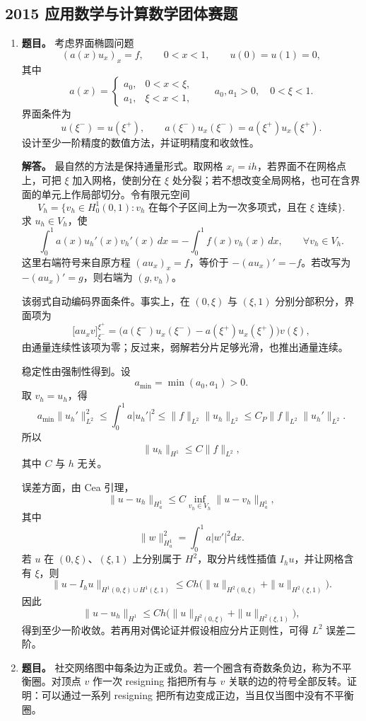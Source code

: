 ﻿\documentclass[UTF8,12pt]{ctexart}
\begin{document}
\subsection{2015 应用数学与计算数学团体赛题}
\begin{enumerate}[label=\textbf{\arabic*.},leftmargin=2.2em]
\item \textbf{题目。} 考虑界面椭圆问题
\[
(a(x)u_x)_x=f,\qquad 0<x<1,\qquad u(0)=u(1)=0,
\]
其中
\[
a(x)=
\begin{cases}
a_0,&0<x<\xi,\\
a_1,&\xi<x<1,
\end{cases}
\qquad a_0,a_1>0,\quad 0<\xi<1.
\]
界面条件为
\[
u(\xi^-)=u(\xi^+),\qquad
a(\xi^-)u_x(\xi^-)=a(\xi^+)u_x(\xi^+).
\]
设计至少一阶精度的数值方法，并证明精度和收敛性。

\textbf{解答。} 最自然的方法是保持通量形式。取网格 \(x_i=ih\)，若界面不在网格点上，可把 \(\xi\) 加入网格，使剖分在 \(\xi\) 处分裂；若不想改变全局网格，也可在含界面的单元上作局部切分。令有限元空间
\[
V_h=\{v_h\in H_0^1(0,1): v_h \text{ 在每个子区间上为一次多项式，且在 }\xi\text{ 连续}\}.
\]
求 \(u_h\in V_h\)，使
\[
\int_0^1 a(x)u_h'(x)v_h'(x)\,dx
=-\int_0^1 f(x)v_h(x)\,dx,\qquad \forall v_h\in V_h.
\]
这里右端符号来自原方程 \((a u_x)_x=f\)，等价于 \(- (a u_x)'=-f\)。若改写为 \(- (a u_x)'=g\)，则右端为 \((g,v_h)\)。

该弱式自动编码界面条件。事实上，在 \((0,\xi)\) 与 \((\xi,1)\) 分别分部积分，界面项为
\[
\bigl[a u_x v\bigr]_{\xi^-}^{\xi^+}
=\bigl(a(\xi^-)u_x(\xi^-)-a(\xi^+)u_x(\xi^+)\bigr)v(\xi),
\]
由通量连续性该项为零；反过来，弱解若分片足够光滑，也推出通量连续。

稳定性由强制性得到。设
\[
a_{\min}=\min(a_0,a_1)>0.
\]
取 \(v_h=u_h\)，得
\[
a_{\min}\|u_h'\|_{L^2}^2
\le \int_0^1a|u_h'|^2
\le \|f\|_{L^2}\|u_h\|_{L^2}
\le C_P\|f\|_{L^2}\|u_h'\|_{L^2}.
\]
所以
\[
\|u_h\|_{H^1}\le C\|f\|_{L^2},
\]
其中 \(C\) 与 \(h\) 无关。

误差方面，由 Cea 引理，
\[
\|u-u_h\|_{H^1_a}
\le C\inf_{v_h\in V_h}\|u-v_h\|_{H^1_a},
\]
其中
\[
\|w\|_{H^1_a}^2=\int_0^1a|w'|^2dx.
\]
若 \(u\) 在 \((0,\xi)\)、\((\xi,1)\) 上分别属于 \(H^2\)，取分片线性插值 \(I_hu\)，并让网格含有 \(\xi\)，则
\[
\|u-I_hu\|_{H^1(0,\xi)\cup H^1(\xi,1)}
\le Ch\bigl(\|u\|_{H^2(0,\xi)}+\|u\|_{H^2(\xi,1)}\bigr).
\]
因此
\[
\|u-u_h\|_{H^1}
\le Ch\bigl(\|u\|_{H^2(0,\xi)}+\|u\|_{H^2(\xi,1)}\bigr),
\]
得到至少一阶收敛。若再用对偶论证并假设相应分片正则性，可得 \(L^2\) 误差二阶。

\item \textbf{题目。} 社交网络图中每条边为正或负。若一个圈含有奇数条负边，称为不平衡圈。对顶点 \(v\) 作一次 resigning 指把所有与 \(v\) 关联的边的符号全部反转。证明：可以通过一系列 resigning 把所有边变成正边，当且仅当图中没有不平衡圈。


\end{enumerate}
\end{document}
